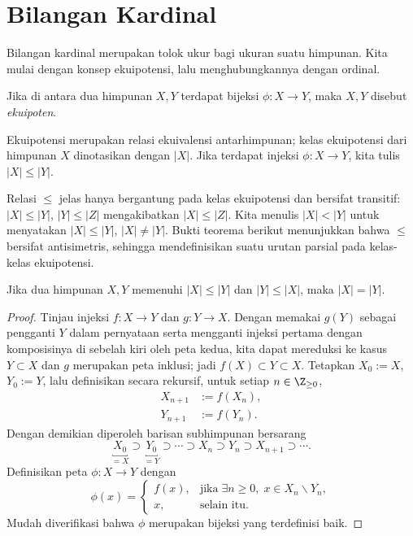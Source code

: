 \section{Bilangan Kardinal}\label{sec:cardinal-number}
Bilangan kardinal merupakan tolok ukur bagi ukuran suatu himpunan. Kita mulai dengan konsep ekuipotensi, lalu menghubungkannya dengan ordinal.

\begin{definition}
	Jika di antara dua himpunan $X, Y$ terdapat bijeksi $\phi: X \to Y$, maka $X, Y$ disebut \emph{ekuipoten}.

	Ekuipotensi merupakan relasi ekuivalensi antarhimpunan; kelas ekuipotensi dari himpunan $X$ dinotasikan dengan $|X|$. Jika terdapat injeksi $\phi: X \to Y$, kita tulis $|X| \leq |Y|$.
\end{definition}

Relasi $\leq$ jelas hanya bergantung pada kelas ekuipotensi dan bersifat transitif: $|X| \leq |Y|$, $|Y| \leq |Z|$ mengakibatkan $|X| \leq |Z|$. Kita menulis $|X| < |Y|$ untuk menyatakan $|X| \leq |Y|$, $|X| \neq |Y|$. Bukti teorema berikut menunjukkan bahwa $\leq$ bersifat antisimetris, sehingga mendefinisikan suatu urutan parsial pada kelas-kelas ekuipotensi.

\begin{theorem}\label{prop:Schröder-Bernstein}
	Jika dua himpunan $X,Y$ memenuhi $|X| \leq |Y|$ dan $|Y| \leq |X|$, maka $|X|=|Y|$.
\end{theorem}
\begin{proof}
	Tinjau injeksi $f: X \to Y$ dan $g: Y \to X$. Dengan memakai $g(Y)$ sebagai pengganti $Y$ dalam pernyataan serta mengganti injeksi pertama dengan komposisinya di sebelah kiri oleh peta kedua, kita dapat mereduksi ke kasus $Y \subset X$ dan $g$ merupakan peta inklusi; jadi $f(X) \subset Y \subset X$. Tetapkan $X_0 := X$, $Y_0 := Y$, lalu definisikan secara rekursif, untuk setiap $n \in \Z_{\geq 0}$,
	\begin{align*}
		X_{n+1} & := f(X_n), \\
		Y_{n+1} & := f(Y_n).
	\end{align*}
	Dengan demikian diperoleh barisan subhimpunan bersarang
	\[ \underbracket{X_0}_{=X} \supset \underbracket{Y_0}_{=Y} \supset \cdots \supset X_n \supset Y_n \supset X_{n+1} \supset \cdots . \]
	Definisikan peta $\phi: X \to Y$ dengan
	\[ \phi(x) = \begin{cases}
		f(x), & \text{jika}\; \exists n \geq 0, \; x \in X_n \smallsetminus Y_n, \\
		x, & \text{selain itu}.
	\end{cases} \]
	Mudah diverifikasi bahwa $\phi$ merupakan bijeksi yang terdefinisi baik.
\end{proof}

